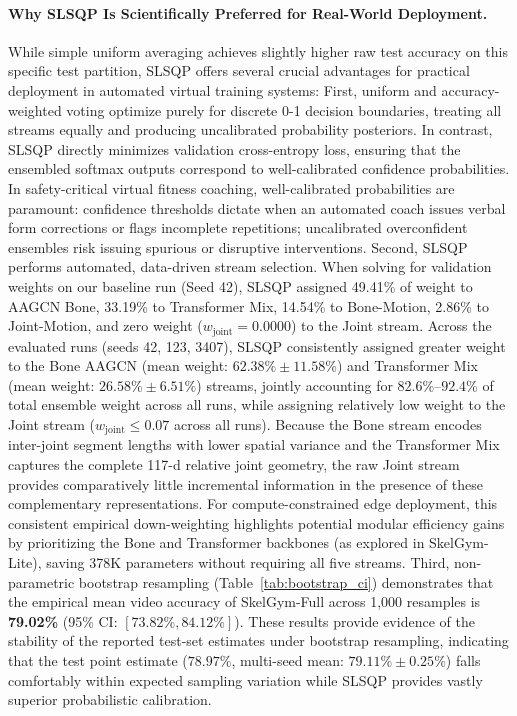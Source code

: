 \documentclass[preprint,12pt]{elsarticle}
\begin{document}
\paragraph{Why SLSQP Is Scientifically Preferred for Real-World Deployment.} While simple uniform averaging achieves slightly higher raw test accuracy on this specific test partition, SLSQP offers several crucial advantages for practical deployment in automated virtual training systems:
First, uniform and accuracy-weighted voting optimize purely for discrete 0-1 decision boundaries, treating all streams equally and producing uncalibrated probability posteriors. In contrast, SLSQP directly minimizes validation cross-entropy loss, ensuring that the ensembled softmax outputs correspond to well-calibrated confidence probabilities. In safety-critical virtual fitness coaching, well-calibrated probabilities are paramount: confidence thresholds dictate when an automated coach issues verbal form corrections or flags incomplete repetitions; uncalibrated overconfident ensembles risk issuing spurious or disruptive interventions.
Second, SLSQP performs automated, data-driven stream selection. When solving for validation weights on our baseline run (Seed 42), SLSQP assigned 49.41\% of weight to AAGCN Bone, 33.19\% to Transformer Mix, 14.54\% to Bone-Motion, 2.86\% to Joint-Motion, and zero weight ($w_{\text{joint}} = 0.0000$) to the Joint stream. Across the evaluated runs (seeds 42, 123, 3407), SLSQP consistently assigned greater weight to the Bone AAGCN (mean weight: $62.38\% \pm 11.58\%$) and Transformer Mix (mean weight: $26.58\% \pm 6.51\%$) streams, jointly accounting for $82.6\%\text{--}92.4\%$ of total ensemble weight across all runs, while assigning relatively low weight to the Joint stream ($w_{\text{joint}} \le 0.07$ across all runs). Because the Bone stream encodes inter-joint segment lengths with lower spatial variance and the Transformer Mix captures the complete 117-d relative joint geometry, the raw Joint stream provides comparatively little incremental information in the presence of these complementary representations. For compute-constrained edge deployment, this consistent empirical down-weighting highlights potential modular efficiency gains by prioritizing the Bone and Transformer backbones (as explored in SkelGym-Lite), saving 378K parameters without requiring all five streams.
Third, non-parametric bootstrap resampling (Table~\ref{tab:bootstrap_ci}) demonstrates that the empirical mean video accuracy of SkelGym-Full across 1,000 resamples is \textbf{79.02\%} (95\% CI: $[73.82\%, 84.12\%]$). These results provide evidence of the stability of the reported test-set estimates under bootstrap resampling, indicating that the test point estimate ($78.97\%$, multi-seed mean: $79.11\% \pm 0.25\%$) falls comfortably within expected sampling variation while SLSQP provides vastly superior probabilistic calibration.
\end{document}
